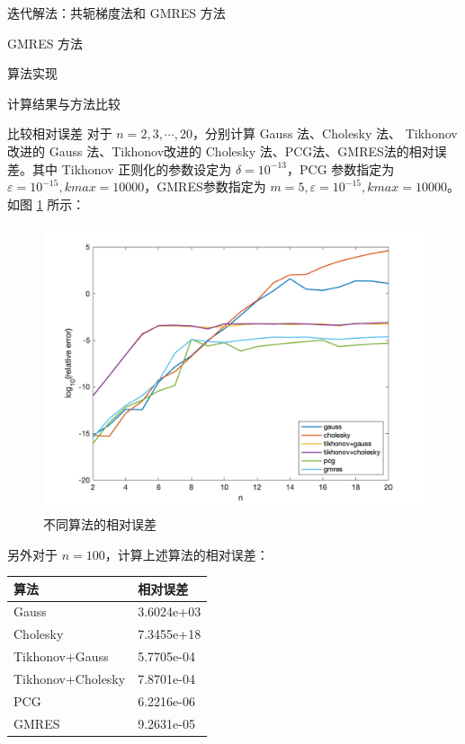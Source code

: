 \documentclass[a4paper]{article}
\begin{document}
\begin{multicols}{2}
\begin{section}{迭代解法：共轭梯度法和 GMRES 方法}
\begin{subsection}{GMRES 方法}
\begin{subsubsection}{算法实现}
		\end{subsubsection}
	
	\end{subsection}
	
\end{section}

\begin{section}{计算结果与方法比较}

	\begin{subsection}{比较相对误差}
		对于 $n=2,3,\cdots,20$，分别计算 Gauss 法、Cholesky 法、 Tikhonov改进的 Gauss 法、Tikhonov改进的 Cholesky 法、PCG法、GMRES法的相对误差。其中 Tikhonov 正则化的参数设定为 $\delta = 10^{-13}$，PCG 参数指定为 $\varepsilon = 10^{-15}, kmax = 10000$，GMRES参数指定为 $m=5, \varepsilon = 10^{-15}, kmax = 10000$。如图 \ref{re} 所示：
		
		\begin{figure}[ht] %
			\centering %
			\includegraphics[width = \textwidth]{img/relative_error.png} 
			\caption{不同算法的相对误差}
			\label{re} 
		\end{figure}
		
		另外对于 $n=100$，计算上述算法的相对误差：
		
		\begin{table}[H]
		\centering
		\begin{tabular}{|l|l|}
		\hline
		算法                & 相对误差       \\ \hline
		Gauss             & 3.6024e+03 \\ \hline
		Cholesky          & 7.3455e+18 \\ \hline
		Tikhonov+Gauss    & 5.7705e-04 \\ \hline
		Tikhonov+Cholesky & 7.8701e-04 \\ \hline
		PCG               & 6.2216e-06 \\ \hline
		GMRES             & 9.2631e-05 \\ \hline
		\end{tabular}
		\end{table}
		

\end{subsection}
\end{section}
\end{multicols}
\end{document}
